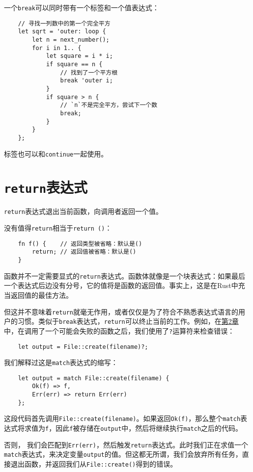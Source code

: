 一个\texttt{break}可以同时带有一个标签和一个值表达式：
\begin{verbatim}
    // 寻找一列数中的第一个完全平方
    let sqrt = 'outer: loop {
        let n = next_number();
        for i in 1.. {
            let square = i * i;
            if square == n {
                // 找到了一个平方根
                break 'outer i;
            }
            if square > n {
                // `n`不是完全平方，尝试下一个数
                break;
            }
        }
    };
\end{verbatim}

标签也可以和\texttt{continue}一起使用。

\section{\texttt{return}表达式}
\texttt{return}表达式退出当前函数，向调用者返回一个值。

没有值得\texttt{return}相当于\texttt{return ()}：
\begin{verbatim}
    fn f() {    // 返回类型被省略：默认是()
        return; // 返回值被省略：默认是()
    }
\end{verbatim}

函数并不一定需要显式的\texttt{return}表达式。函数体就像是一个块表达式：如果最后一个表达式后边没有分号，它的值将是函数的返回值。事实上，这是在Rust中充当返回值的最佳方法。

但这并不意味着\texttt{return}就毫无作用，或者仅仅是为了符合不熟悉表达式语言的用户的习惯。类似于\texttt{break}表达式，\texttt{return}可以终止当前的工作。例如，在\hyperref[ch02]{第2章}中，在调用了一个可能会失败的函数之后，我们使用了\texttt{?}运算符来检查错误：
\begin{verbatim}
    let output = File::create(filename)?;
\end{verbatim}

我们解释过这是\texttt{match}表达式的缩写：
\begin{verbatim}
    let output = match File::create(filename) {
        Ok(f) => f,
        Err(err) => return Err(err)
    };
\end{verbatim}

这段代码首先调用\texttt{File::create(filename)}。如果返回\texttt{Ok(f)}，那么整个\texttt{match}表达式将求值为\texttt{f}，因此\texttt{f}被存储在\texttt{output}中，然后将继续执行\texttt{match}之后的代码。

否则， 我们会匹配到\texttt{Err(err)}，然后触发\texttt{return}表达式。此时我们正在求值一个\texttt{match}表达式，来决定变量\texttt{output}的值。但这都无所谓，我们会放弃所有任务，直接退出函数，并返回我们从\texttt{File::create()}得到的错误。

